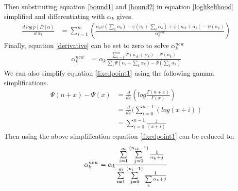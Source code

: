 \documentclass{article} %
\newcommand{\?}{\stackrel{?}{=}}
\begin{document}
Then substituting equation \ref{bound1} and \ref{bound2} in equation \ref{loglikelihood} simplified and differentiating with $\alpha_k$ gives.
\begin{align}
\frac{d\ log\ p(D\ |\ \alpha)}{d\ \alpha_k} &= 
\sum_{i=1}^{m} \left(\frac{\alpha_k{ \psi(\sum_{k}\alpha_k) - \psi(n_i+\sum_{k}\alpha_k) + \psi(n_{ik} + \alpha_k) - \psi(\alpha_k) }}{\alpha_{k}^{new}}\right)\label{derivative}
\end{align}
Finally, equation \ref{derivative} can be set to zero to solve $\alpha_{k}^{new}$
\begin{align}
\alpha_k^{new} &= \alpha_k \frac{\sum\limits_{i=1}^{m}\Psi(n_{ik}+\alpha_k)- \Psi(\alpha_k)}{\sum\limits_{i}\Psi(n_i +\sum\limits_k \alpha_k) - \Psi(\sum\limits_k \alpha_k)}\label{fixedpoint1}
\end{align}
We can also simplify equation \ref{fixedpoint1} using the following gamma simplifications.
\begin{align}
\Psi(n+x)-\Psi(x) &= \frac{d}{dx}(log\frac{ \Gamma(n+x)}{\Gamma(x)})\\
&=\frac{d}{dx}(\sum\limits_{i=0}^{n-1}( log (x+i))\\
&=\sum\limits_{i=0}^{n-1}\frac{1}{(x+i)}
\end{align}
Then using the above simplification equation \ref{fixedpoint1} can be reduced to:
\begin{align}
\alpha_k^{new} &= \alpha_k \frac{\sum\limits_{i=1}^{m}  \sum\limits_{j=0}^{(n_{ik}-1)}\frac{1}{\alpha_k +j}}{\sum\limits_{i=1}^{m}\sum\limits\limits_{j=0}^{(n_{i}-1)}\frac{1}{\sum\limits_k \alpha_k +j}}\\
\end{align}
\end{document}

